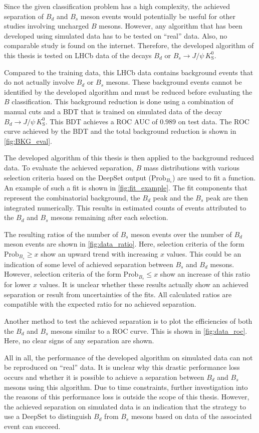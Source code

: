 Since the given classification problem has a high complexity, the achieved separation of $B_d$ and $B_s$ meson events would potentially be useful for other studies involving uncharged $B$ mesons.
However, any algorithm that has been developed using simulated data has to be tested on \enquote{real} data. 
Also, no comparable study is found on the internet.
Therefore, the developed algorithm of this thesis is tested on LHCb data of the decays $B_d \text{ or } B_s \rightarrow J/\psi \, K^0_\text{S}$.

Compared to the training data, this LHCb data contains background events that do not actually involve $B_d$ or $B_s$ mesons.
These background events cannot be identified by the developed algorithm and must be reduced before evaluating the $B$ classification.
This background reduction is done using a combination of manual cuts and a BDT that is trained on simulated data of the decay $B_d \rightarrow J/\psi \, K^0_\text{S}$.
This BDT achieves a ROC AUC of $0.989$ on test data.
The ROC curve achieved by the BDT and the total background reduction is shown in \autoref{fig:BKG_eval}.

The developed algorithm of this thesis is then applied to the background reduced data.
To evaluate the achieved separation, $B$ mass distributions with various selection criteria based on the DeepSet output ($\text{Prob}_{B_s}$) are used to fit a function.
An example of such a fit is shown in \autoref{fig:fit_example}.
The fit components that represent the combinatorial background, the $B_d$ peak and the $B_s$ peak are then integrated numerically.
This results in estimated counts of events attributed to the $B_d$ and $B_s$ mesons remaining after each selection.

The resulting ratios of the number of $B_s$ meson events over the number of $B_d$ meson events are shown in \autoref{fig:data_ratio}.
Here, selection criteria of the form $\text{Prob}_{B_s} \geq x$ show an upward trend with increasing $x$ values.
This could be an indication of some level of achieved separation between $B_s$ and $B_d$ mesons.
However, selection criteria of the form $\text{Prob}_{B_s} \leq x$ show an increase of this ratio for lower $x$ values.
It is unclear whether these results actually show an achieved separation or result from uncertainties of the fits.
All calculated ratios are compatible with the expected ratio for no achieved separation.

Another method to test the achieved separation is to plot the efficiencies of both the $B_d$ and $B_s$ mesons similar to a ROC curve.
This is shown in \autoref{fig:data_roc}.
Here, no clear signs of any separation are shown.

All in all, the performance of the developed algorithm on simulated data can not be reproduced on \enquote{real} data.
It is unclear why this drastic performance loss occurs and whether it is possible to achieve a separation between $B_d$ and $B_s$ mesons using this algorithm.
Due to time constraints, further investigation into the reasons of this performance loss is outside the scope of this thesis.
However, the achieved separation on simulated data is an indication that the strategy to use a DeepSet to distinguish $B_d$ from $B_s$ mesons based on data of the associated event can succeed.

